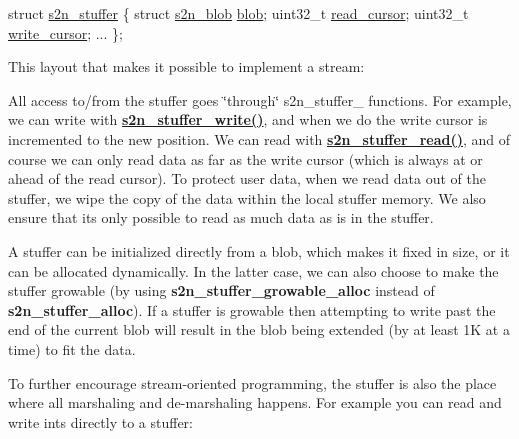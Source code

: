 \begin{DoxyCode}
\textcolor{keyword}{struct }\hyperlink{structs2n__stuffer}{s2n\_stuffer} \{
    \textcolor{keyword}{struct }\hyperlink{structs2n__blob}{s2n\_blob} \hyperlink{structs2n__stuffer_ab95f00f583f1cb41ae00918e9ea180c9}{blob};
    uint32\_t \hyperlink{structs2n__stuffer_a5d643ee7dd6cd0eba779a284dce4a3f6}{read\_cursor};
    uint32\_t \hyperlink{structs2n__stuffer_a19d9286958de6627ef95be4d9b9b3d1a}{write\_cursor};
    ...
\};
\end{DoxyCode}


This layout that makes it possible to implement a stream\+:



All access to/from the stuffer goes \char`\"{}through\char`\"{} s2n\+\_\+stuffer\+\_\+ functions. For example, we can write with {\bfseries \hyperlink{s2n__stuffer_8c_ad77ea23089bbeb19b897a73bf6ca3fde}{s2n\+\_\+stuffer\+\_\+write()}}, and when we do the write cursor is incremented to the new position. We can read with {\bfseries \hyperlink{s2n__stuffer_8c_a49bb9749c055c6fb6f713cebeaa14cb5}{s2n\+\_\+stuffer\+\_\+read()}}, and of course we can only read data as far as the write cursor (which is always at or ahead of the read cursor). To protect user data, when we read data out of the stuffer, we wipe the copy of the data within the local stuffer memory. We also ensure that it\textquotesingle{}s only possible to read as much data as is in the stuffer.

A stuffer can be initialized directly from a blob, which makes it fixed in size, or it can be allocated dynamically. In the latter case, we can also choose to make the stuffer growable (by using {\bfseries s2n\+\_\+stuffer\+\_\+growable\+\_\+alloc} instead of {\bfseries s2n\+\_\+stuffer\+\_\+alloc}). If a stuffer is growable then attempting to write past the end of the current blob will result in the blob being extended (by at least 1K at a time) to fit the data.

To further encourage stream-\/oriented programming, the stuffer is also the place where all marshaling and de-\/marshaling happens. For example you can read and write ints directly to a stuffer\+:


